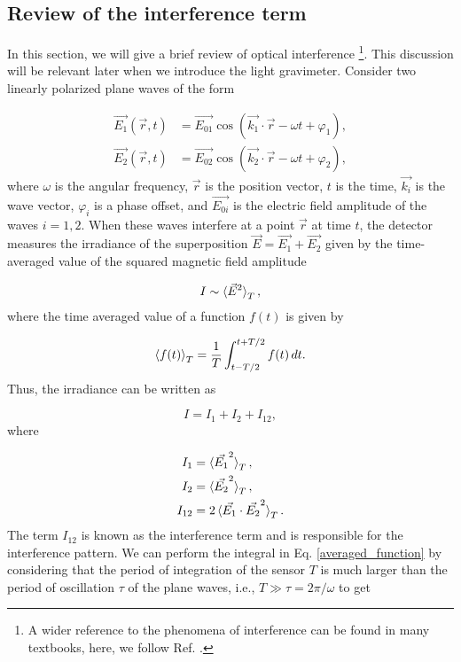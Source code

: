 \documentclass{article}
\begin{document}
\subsection{Review of the interference term}
In this section, we will give a brief review of optical interference \footnote{A wider reference to the phenomena of interference can be found in many textbooks, here, we follow Ref. \cite{Hecht2016-lx}.}. This discussion will be relevant later when we introduce the light gravimeter. Consider two linearly polarized plane waves of the form

\begin{equation}
\label{plane_waves}
    \begin{aligned}
    \Vec{E_{1}}(\Vec{r}, t) &= \Vec{E_{01}} \cos (\Vec{k_{1}} \cdot \Vec{r} - \omega t + \varphi_{1}), \\
    \Vec{E_{2}}(\Vec{r}, t) &= \Vec{E_{02}} \cos (\Vec{k_{2}} \cdot \Vec{r} - \omega t + \varphi_{2}),
    \end{aligned}
\end{equation}
%
where $\omega$ is the angular frequency, $\Vec{r}$ is the position vector, $t$ is the time, $\Vec{k_{i}}$ is the wave vector, $\varphi_{i}$ is a phase offset, and $\Vec{E_{0i}}$ is the electric field amplitude of the waves $i=1,2$. When these waves interfere at a point $\Vec{r}$ at time $t$, the detector measures the irradiance of the superposition $\Vec{E} = \Vec{E_{1}} + \Vec{E_{2}}$ given by the time-averaged value of the squared magnetic field amplitude

\begin{equation}
    I \sim \braket{\Vec{E}^{2}}_{T},
\end{equation}
%
where the time averaged value of a function $f(t)$ is given by

\begin{equation}
\label{averaged_function}
    \braket{f(t)}_{T} = \frac{1}{T} \int_{t-T/2}^{t+T/2} f(t) \,dt.
\end{equation}
%
Thus, the irradiance can be written as

\begin{equation}
    I = I_{1} + I_{2} + I_{12},
\end{equation}
%
where

\begin{equation}
    \begin{aligned}
        I_{1} &= \braket{\Vec{E_{1}}^{2}}_{T},\\
        I_{2} &= \braket{\Vec{E_{2}}^{2}}_{T},\\
        I_{12} &= 2 \braket{\Vec{E_{1}} \cdot \Vec{E_{2}}^{2}}_{T}.
    \end{aligned}
\end{equation}
%
The term $I_{12}$ is known as the interference term and is responsible for the interference pattern. We can perform the integral in Eq. \ref{averaged_function} by considering that the period of integration of the sensor $T$ is much larger than the period of oscillation $\tau$ of the plane waves, i.e., $T \gg \tau = 2\pi/\omega$ to get
\end{document}
